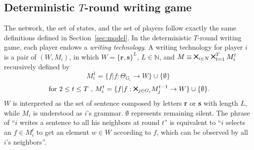\documentclass[12pt,letter]{article}
\theoremstyle{definition}
\theoremstyle{remark}
\theoremstyle{claim}
\newcommand{\bigtimes}{\mathbin{\tikz [x=1.4ex,y=1.4ex,line width=.2ex] \draw (0,0) -- (1,1) (0,1) -- (1,0);}}%
\begin{document}
\subsection{Deterministic $T$-round writing game}
\label{sec:writing}
The network, the set of states, and the set of players follow exactly the same definitions defined in Section~\ref{sec:model}. In the deterministic $T$-round writing game, each player endows a \textit{writing technology}. A writing technology for player $i$ is a pair of $(W,M_i)$, in which $W=\{{\textbf{r}},\textbf{s}\}^L$, $L\in \mathbb{N}$, and $M\equiv \bigtimes_{i\in N}\bigtimes^T_{t=1}M^{t}_i$ recursively defined by
\[M^1_i=\{f|f:\Theta_{G_i}\rightarrow W\}\cup \{\emptyset\}\]
\[ \text{ for } 2\leq t \leq T\text{ , }M^{t}_i=\{f|f:\bigtimes_{j\in G_i}M^{t-1}_j\rightarrow W\}\cup \{\emptyset\}. \]
$W$ is interpreted as the set of sentence composed by letters \textbf{r} or \textbf{s} with length $L$, while $M_i$ is understood as $i$'s grammar. $\emptyset$ represents remaining silent. The phrase of ``$i$ writes a sentence to all his neighbors at round $t$'' is equivalent to ``$i$ selects an $f\in M^t_i$ to get an element $w\in W$ according to $f$, which can be observed by all $i$'s neighbors''. 
\end{document}

